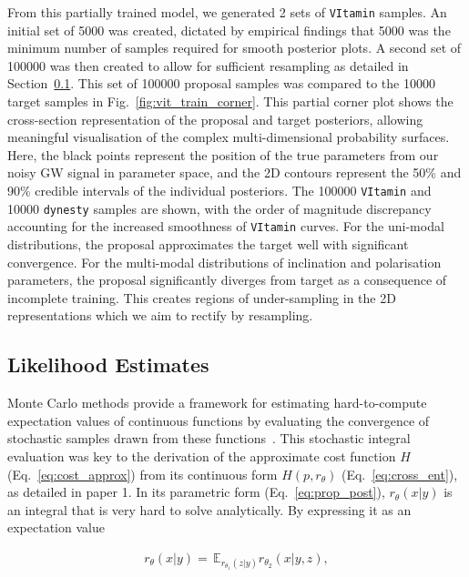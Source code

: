 \documentclass[a4paper]{jpconf}
\begin{document}
From this partially trained model, we generated 2 sets of \texttt{VItamin} samples. An initial set of 5000 was created, dictated by empirical findings that 5000 was the minimum number of samples required for smooth posterior plots. A second set of 100000 was then created to allow for sufficient resampling as detailed in Section~\ref{method:monte}. This set of 100000 proposal samples was compared to the 10000 target samples in Fig.~\ref{fig:vit_train_corner}. This partial corner plot shows the cross-section representation of the proposal and target posteriors, allowing meaningful visualisation of the complex multi-dimensional probability surfaces. Here, the black points represent the position of the true parameters from our noisy GW signal in parameter space, and the 2D contours represent the 50\% and 90\% credible intervals of the individual posteriors. The 100000 \texttt{VItamin} and 10000 \texttt{dynesty} samples are shown, with the order of magnitude discrepancy accounting for the increased smoothness of \texttt{VItamin} curves. For the uni-modal distributions, the proposal approximates the target well with significant convergence. For the multi-modal distributions of inclination and polarisation parameters, the proposal significantly diverges from target as a consequence of incomplete training. This creates regions of under-sampling in the 2D representations which we aim to rectify by resampling.

\subsection{Likelihood Estimates}\label{method:monte}

Monte Carlo methods provide a framework for estimating hard-to-compute expectation values of continuous functions by evaluating the convergence of stochastic samples drawn from these functions~\cite{brian2006resampling}. This stochastic integral evaluation was key to the derivation of the approximate cost function $H$ (Eq.~\ref{eq:cost_approx}) from its continuous form $H(p,r_\theta)$ (Eq.~\ref{eq:cross_ent}), as detailed in paper 1. In its parametric form (Eq.~\ref{eq:prop_post}), $r_\theta(x|y)$ is an integral that is very hard to solve analytically. By expressing it as an expectation value 

\begin{align}\label{eq:monte_approx}
	r_{\theta}(x|y) =\,\mathbb{E}_{r_{\theta_1}(z|y)}r_{\theta_2}(x|y,z),
\end{align}
\end{document}
